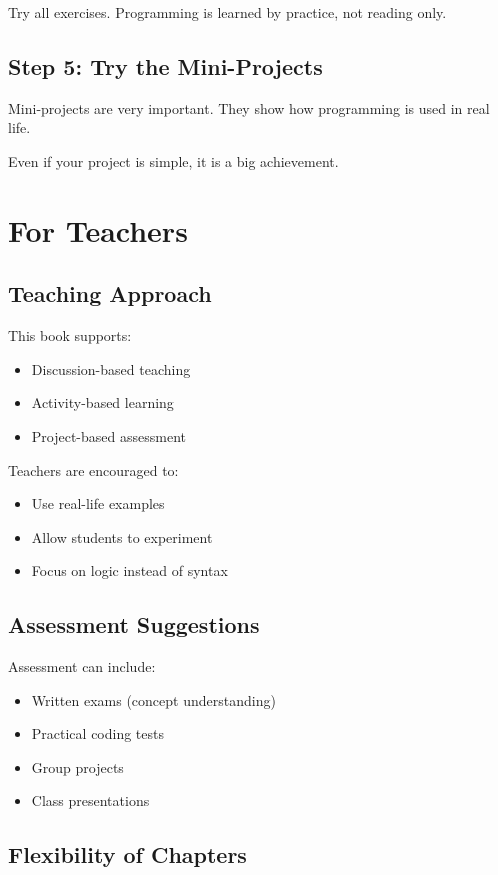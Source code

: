 Try all exercises.
Programming is learned by practice, not reading only.

\subsection*{Step 5: Try the Mini-Projects}

Mini-projects are very important.
They show how programming is used in real life.

Even if your project is simple, it is a big achievement.

\section*{For Teachers}

\subsection*{Teaching Approach}

This book supports:
\begin{itemize}
    \item Discussion-based teaching
    \item Activity-based learning
    \item Project-based assessment
\end{itemize}

Teachers are encouraged to:
\begin{itemize}
    \item Use real-life examples
    \item Allow students to experiment
    \item Focus on logic instead of syntax
\end{itemize}

\subsection*{Assessment Suggestions}

Assessment can include:
\begin{itemize}
    \item Written exams (concept understanding)
    \item Practical coding tests
    \item Group projects
    \item Class presentations
\end{itemize}

\subsection*{Flexibility of Chapters}

